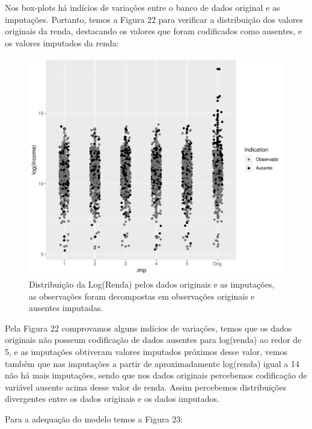 \documentclass[]{article}
\begin{document}
Nos box-plots há indícios de variações entre o banco de dados original e
as imputações. Portanto, temos a Figura 22 para verificar a distribuição
dos valores originais da renda, destacando os valores que foram
codificados como ausentes, e os valores imputados da renda:

\begin{figure}[H]

{\centering \includegraphics[width=0.6\linewidth]{Relatorio_IC_files/figure-latex/unnamed-chunk-30-1} 

}

\caption{Distribuição da Log(Renda) pelos dados originais e as imputações, as observações foram decompostas em observações originais e ausentes imputadas.}\label{fig:unnamed-chunk-30}
\end{figure}

Pela Figura 22 comprovamos alguns indícios de variações, temos que os
dados originais não posseum codificação de dados ausentes para
log(renda) ao redor de 5, e as imputações obtiveram valores imputados
próximos desse valor, vemos também que nas imputações a partir de
aproximadamente log(renda) igual a 14 não há mais imputações, sendo que
nos dados originais percebemos codificação de variável ausente acima
desse valor de renda. Assim percebemos distribuições divergentes entre
os dados originais e os dados imputados.

Para a adequação do modelo temos a Figura 23:
\end{document}

